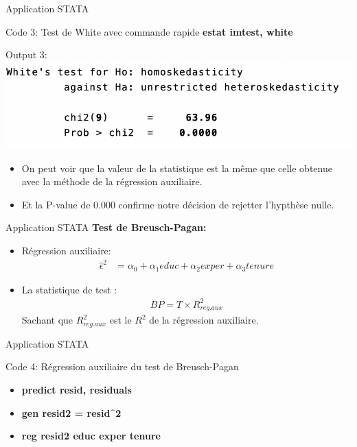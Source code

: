 \documentclass{beamer}
\begin{document}
\begin{frame}{Application STATA}
\begin{block}{Code 3: Test de White avec commande rapide}
\textbf{estat imtest, white}
\end{block}
\begin{block}{Output 3:}
\includegraphics[scale=.5]{white.png}
\begin{itemize}
\item On peut voir que la valeur de la statistique est la même que celle obtenue avec la méthode de la régression auxiliaire.
\item Et la P-value de 0.000 confirme notre décision de rejetter l'hypthèse nulle.
\end{itemize}
\end{block}
\end{frame}


\begin{frame}{Application STATA}
\textbf{Test de Breusch-Pagan:}
\begin{itemize}
\item Régression auxiliaire:
\begin{align*}
\hat{\epsilon}^2 & = \alpha_0+\alpha_1 educ+\alpha_2 exper+\alpha_3 tenure 
\end{align*}
\item La statistique de test :
\begin{align*}
BP = T \times R_{reg.aux}^2
\end{align*}
Sachant que $R_{reg.aux}^2$ est le $R^2$ de la régression auxiliaire.
\end{itemize}
\end{frame}

\begin{frame}{Application STATA}
\begin{block}{Code 4: Régression auxiliaire du test de Breusch-Pagan}
\begin{itemize}
 \item \textbf{predict resid, residuals}
 \item \textbf{gen resid2 = resid\string^2}
 \item \textbf{reg resid2 educ exper tenure}
\end{itemize}
\end{block}
\end{frame}
\end{document}
